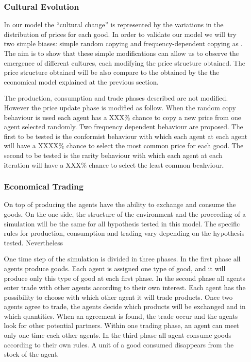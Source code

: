 \documentclass{wscpaperproc}
\begin{document}
\subsubsection{Cultural Evolution}

In our model the ``cultural change'' is represented by the variations in the distribution of prices for each good. In order to validate our model we will try two simple biases: simple random copying and frequency-dependent copying as \cite{mesoudi_random_2009}. The aim is to show that these simple modifications can allow us to observe the emergence of different cultures, each modifying the price structure obtained. The price structure obtained will be also compare to the obtained by the the economical model explained at the previous section.

The production, consumption and trade phases described are not modified. However the price update phase is modified as follow. When the random copy behaviour is used each agent has a XXX\% chance to copy a new price from one agent selected randomly. Two frequency dependent behaviour are proposed. The first to be tested is the conformist behaviour with which each agent at each agent will have a XXXX\% chance to select the most common price for each good. The second to be tested is the rarity behaviour with which each agent at each iteration will have a XXX\% chance to select the least common beahviour.

\subsubsection{Economical Trading}\label{trade}

On top of producing the agents have the ability to exchange and consume the goods. 
On the one side, the structure of the environment and the proceeding of a simulation will be the same for all hypothesis tested in this model. The specific rules for production, consumption and trading vary depending on the hypothesis tested. Nevertheless 

One time step of the simulation is divided in three phases. In the first phase all agents produce goods. Each agent is assigned one type of good, and it will produce only this type of good at each first phase. In the second phase all agents enter trade with other agents according to their own interest. Each agent has the possibility to choose with which other agent it will trade products. Once two agents agree to trade, the agents decide which products will be exchanged and in which quantities. When an agreement is found, the trade occur and the agents look for other potential partners. Within one trading phase, an agent can meet only one time each other agents. In the third phase all agent consume goods according to their own rules. A unit of a good consumed disappears from the stock of the agent.
\end{document}

